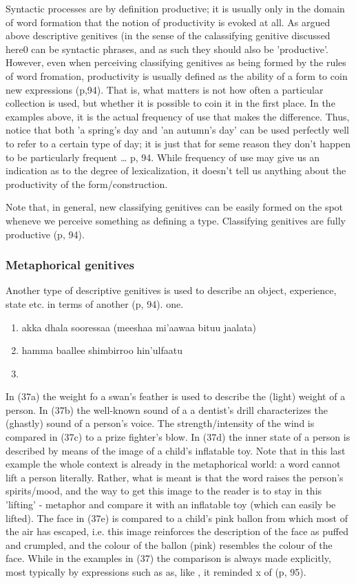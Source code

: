 \documentclass[11pt,a4paper]{article}
\begin{document}
	Syntactic processes are by definition productive; it is usually only in the domain of word formation that the notion
	of productivity is evoked at all. As argued above descriptive genitives (in the sense of the calassifying genitive discussed here0
	can be syntactic phrases, and as such they should also be 'productive'. However, even when perceiving classifying genitives
	as being formed by the rules of word fromation, productivity is usually defined as the ability of a form to coin new
	expressions (p,94). That is, what matters is not how often a particular collection is used, but whether it is possible to coin
	it in the first place. In the examples above, it is the actual frequency of use that makes the difference. Thus, notice
	that both 'a spring's day and 'an autumn's day' can be used perfectly well to refer to a certain type of day; it is just
	that for seme reason they don't happen to be particularly frequent \ldots{} p, 94. While frequency of use may give us an indication
	as to the degree of lexicalization, it doesn't tell us anything about the productivity of the form/construction. 
	
	Note that, in general, new classifying genitives can be easily formed on the spot wheneve we perceive something as defining a type.
	Classifying genitives are fully productive (p, 94). 
	
	
	\subsubsection{Metaphorical genitives}
	
	Another type of descriptive genitives is used to describe an object, experience, state etc. in terms of another (p, 94). 
	one. 
	
	\begin{enumerate}
		\item akka dhala sooressaa (meeshaa mi'aawaa bituu jaalata)
		\item hamma baallee shimbirroo hin'ulfaatu
		\item 
	\end{enumerate}
	
	In (37a) the weight fo a swan's feather is used to describe the (light) weight of a person. In (37b) the well-known sound
	of a a dentist's drill characterizes the (ghastly) sound of a person's voice. The strength/intensity of the wind 
	is compared in (37c) to a prize fighter's blow. In (37d) the inner state of a person is described by means of the image
	of a child's inflatable toy. Note that in this last example the whole context is already in the metaphorical world:
	a word cannot lift a person literally. Rather, what is meant is that the word raises the person's spirits/mood, and 
	the way to get this image to the reader is to stay in this 'lifting' - metaphor and compare it with an inflatable toy
	(which can easily be lifted). The face in (37e) is compared to a child's pink ballon from which most of the air has escaped, 
	i.e. this image reinforces the description of the face as puffed and crumpled, and the colour of the ballon (pink)
	resembles the colour of the face. While in the examples in (37) the comparison is always made explicitly, most typically
	by expressions such as as, like , it reminded x of (p, 95). 
	
\end{document}
